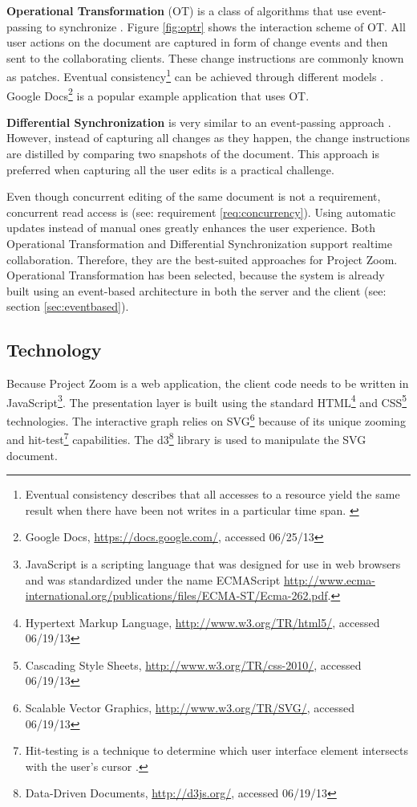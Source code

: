 \textbf{Operational Transformation} (OT) is a class of algorithms that use event-passing to synchronize \cite{Ellis_1989}. Figure \ref{fig:optr} shows the interaction scheme of OT. All user actions on the document are captured in form of change events and then sent to the collaborating clients. These change instructions are commonly known as patches. Eventual consistency\footnote{Eventual consistency describes that all accesses to a resource yield the same result when there have been not writes in a particular time span. \cite{Gustavsson_2002}} can be achieved through different models \cite{Sun_1998} \cite{Li_2004} \cite{Li_2005}. Google Docs\footnote{Google Docs, \url{https://docs.google.com/}, accessed 06/25/13} is a popular example application that uses OT.

\textbf{Differential Synchronization} is very similar to an event-passing approach \cite{Fraser_2009}. However, instead of capturing all changes as they happen, the change instructions are distilled by comparing two snapshots of the document. This approach is preferred when capturing all the user edits is a practical challenge.

Even though concurrent editing of the same document is not a requirement, concurrent read access is (see: requirement \ref{req:concurrency}). Using automatic updates instead of manual ones greatly enhances the user experience. Both Operational Transformation and Differential Synchronization support realtime collaboration. Therefore, they are the best-suited approaches for Project Zoom. Operational Transformation has been selected, because the system is already built using an event-based architecture in both the server \cite{Bocklisch_2013} and the client (see: section \ref{sec:eventbased}).

\subsection{Technology}
Because Project Zoom is a web application, the client code needs to be written in JavaScript\footnote{JavaScript is a scripting language that was designed for use in web browsers and was standardized under the name ECMAScript \url{http://www.ecma-international.org/publications/files/ECMA-ST/Ecma-262.pdf}.}. The presentation layer is built using the standard HTML\footnote{Hypertext Markup Language, \url{http://www.w3.org/TR/html5/}, accessed 06/19/13} and CSS\footnote{Cascading Style Sheets, \url{http://www.w3.org/TR/css-2010/}, accessed 06/19/13} technologies. The interactive graph relies on SVG\footnote{Scalable Vector Graphics, \url{http://www.w3.org/TR/SVG/}, accessed 06/19/13} because of its unique zooming and hit-test\footnote{Hit-testing is a technique to determine which user interface element intersects with the user's cursor \cite{Foley_1995}.} capabilities. The d3\footnote{Data-Driven Documents, \url{http://d3js.org/}, accessed 06/19/13} library is used to manipulate the SVG document.

